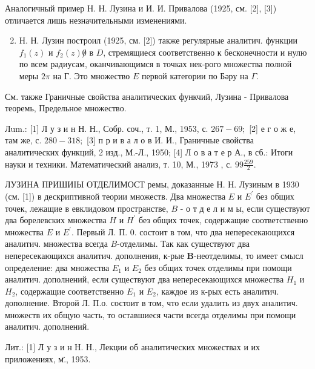 \documentclass[10pt]{article}
\begin{document}
Аналогичный пример Н. Н. Лузина и И. И. Привалова (1925, см. [2], [3]) отличается лишь незначительными изменениями.



\begin{enumerate}

  \setcounter{enumi}{1}

  \item Н. Н. Лузин построил (1925, см. [2]) также регулярные аналитич. функции $f_{1}(z)$ и $f_{2}(z) \not 0$ в $D$, стремящиеся соответственно к бесконечности и нулю по всем радиусам, оканчивающимся в точках нек-рого множества полной меры $2 \pi$ на Г. Это множество $E$ первой категории по Бәру на $\Gamma$.

\end{enumerate}



См. также Граничные свойства аналитических функчий, Лузина - Привалова теоремь, Предельное множество.



Лum.: [1] Л у з и н Н. Н., Собр. соч., т. 1, М., 1953, с. $267-69 ;$ [2] е г о ж е, там же, с. $280-318 ;$ [3] п р и в а л о в И. И., Граничные свойства аналитических функций, 2 изд., М.-Л., 1950; [4] Л о в а т е р А., в сб.: Итоги науки и техники. Математический анализ, т. 10, М., 1973 , с. $99 \frac{259}{2}$.



ЛУЗИНА ПРИШИІЫ ОТДЕЛИМОСТ ремы, доказанные Н. Н. Лузиным в 1930 (см. [1]) в дескриптивной теории множеств. Два множества $E$ и $E^{\prime}$ без общих точек, лежащие в евклидовом пространстве, $B$ - о т д е л и м ы, если существуют два борелевских множества $H$ и $H^{\prime}$ без общих точек, содержащие соответственно множества $E$ и $E^{\prime}$. Первый Л. П. 0. состоит в том, что два непересекающихся аналитич. множества всегда $B$-отделимы. Так как существуют два непересекающихся аналитич. дополнения, к-рые $\boldsymbol{B}$-неотделимы, то имеет смысл определение: два множества $E_{1}$ и $E_{2}$ без общих точек отделимы при помощи аналитич. дополнений, если существуют два непересекающихся множества $H_{1}$ и $H_{2}$, содержащие соответственно $E_{1}$ и $E_{2}$, каждое из к-рых есть аналитич. дополнение. Второй Л. П.о. состоит в том, что если удалить из двух аналитич. множеств их общую часть, то оставшиеся части всегда отделимы при помощи аналитич. дополнений.



Лит.: [1] Л у з и н Н. Н., Лекции об аналитических множествах и их приложениях, м̈., 1953.
\end{document}
